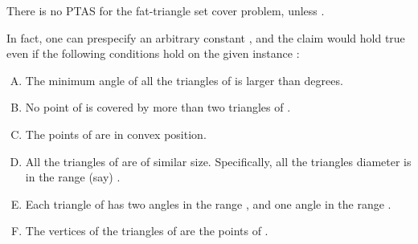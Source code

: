 \documentclass[12pt]{article}
\providecommand{\PTAS}{\textsf{\si{PTAS}}\xspace}
\begin{document}
\begin{lemma}
    There is no \PTAS for the fat-triangle set cover problem, unless
    . 

    In fact, one can prespecify an arbitrary constant , and
    the claim would hold true even if the following conditions hold on
    the given instance :
    \begin{center}
    \begin{minipage}{0.9\linewidth}
    \begin{enumerate}[(A)]
        \item The minimum angle of all the triangles of  is
        larger than  degrees.

        \item No point of  is covered by more than two
        triangles of .

        \item The points of  are in convex position.

        \item All the triangles of  are of similar
        size. Specifically, all the triangles diameter is in the range
        (say) .

        \item Each triangle of  has two angles in
        the range , and one angle in the
        range .

        \item The vertices of the triangles of  are the
        points of .
    \end{enumerate}
    \end{minipage}
    \end{center}

\end{lemma}
\end{document}
